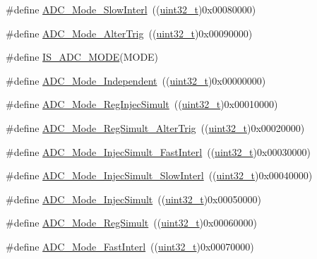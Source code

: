 \begin{DoxyCompactItemize}
\item 
\#define \hyperlink{group___a_d_c__mode_ga8b81e27e98dbc3d1e31452dbad167cd5}{A\+D\+C\+\_\+\+Mode\+\_\+\+Slow\+Interl}~((\hyperlink{_p_e___types_8h_a33594304e786b158f3fb30289278f5af}{uint32\+\_\+t})0x00080000)
\item 
\#define \hyperlink{group___a_d_c__mode_ga5595f12dc485e301ba3bad0e165586c1}{A\+D\+C\+\_\+\+Mode\+\_\+\+Alter\+Trig}~((\hyperlink{_p_e___types_8h_a33594304e786b158f3fb30289278f5af}{uint32\+\_\+t})0x00090000)
\item 
\#define \hyperlink{group___a_d_c__mode_ga4abf4c7de28a42d7b124c9e403a6e537}{I\+S\+\_\+\+A\+D\+C\+\_\+\+M\+O\+DE}(M\+O\+DE)
\item 
\#define \hyperlink{group___a_d_c__mode_ga2754d3a35559dc10e3d6a7d920e83432}{A\+D\+C\+\_\+\+Mode\+\_\+\+Independent}~((\hyperlink{_p_e___types_8h_a33594304e786b158f3fb30289278f5af}{uint32\+\_\+t})0x00000000)
\item 
\#define \hyperlink{group___a_d_c__mode_ga487d5f0c506291c5d37b53198396fd1c}{A\+D\+C\+\_\+\+Mode\+\_\+\+Reg\+Injec\+Simult}~((\hyperlink{_p_e___types_8h_a33594304e786b158f3fb30289278f5af}{uint32\+\_\+t})0x00010000)
\item 
\#define \hyperlink{group___a_d_c__mode_gae3d5fbf93f60d75534364bf9db78f632}{A\+D\+C\+\_\+\+Mode\+\_\+\+Reg\+Simult\+\_\+\+Alter\+Trig}~((\hyperlink{_p_e___types_8h_a33594304e786b158f3fb30289278f5af}{uint32\+\_\+t})0x00020000)
\item 
\#define \hyperlink{group___a_d_c__mode_ga2fc8a737f7b2375309bccbcb7fdbbfeb}{A\+D\+C\+\_\+\+Mode\+\_\+\+Injec\+Simult\+\_\+\+Fast\+Interl}~((\hyperlink{_p_e___types_8h_a33594304e786b158f3fb30289278f5af}{uint32\+\_\+t})0x00030000)
\item 
\#define \hyperlink{group___a_d_c__mode_gacb72230cb48a577907729d426be69c22}{A\+D\+C\+\_\+\+Mode\+\_\+\+Injec\+Simult\+\_\+\+Slow\+Interl}~((\hyperlink{_p_e___types_8h_a33594304e786b158f3fb30289278f5af}{uint32\+\_\+t})0x00040000)
\item 
\#define \hyperlink{group___a_d_c__mode_ga2339cc471aaf2db02daa4aeb49e9f0d9}{A\+D\+C\+\_\+\+Mode\+\_\+\+Injec\+Simult}~((\hyperlink{_p_e___types_8h_a33594304e786b158f3fb30289278f5af}{uint32\+\_\+t})0x00050000)
\item 
\#define \hyperlink{group___a_d_c__mode_ga71298f7453c2b4392a9c622328b3c93d}{A\+D\+C\+\_\+\+Mode\+\_\+\+Reg\+Simult}~((\hyperlink{_p_e___types_8h_a33594304e786b158f3fb30289278f5af}{uint32\+\_\+t})0x00060000)
\item 
\#define \hyperlink{group___a_d_c__mode_ga843ecdd53625e2088e91819e43106a7a}{A\+D\+C\+\_\+\+Mode\+\_\+\+Fast\+Interl}~((\hyperlink{_p_e___types_8h_a33594304e786b158f3fb30289278f5af}{uint32\+\_\+t})0x00070000)

\end{DoxyCompactItemize}
